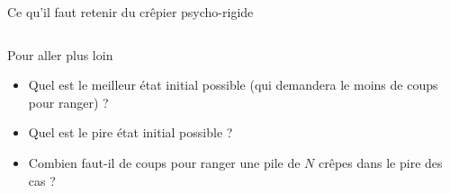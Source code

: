 \begin{frame}{Ce qu'il faut retenir du  crêpier psycho-rigide}
\begin{columns}
\begin{column}{.3\linewidth}
\begin{block}{Pour aller plus loin}
        \begin{itemize}
          \item Quel est le meilleur état initial possible (qui demandera le moins de coups pour ranger) ?
          \item Quel est le pire état initial possible ?
          \item Combien faut-il de coups pour ranger une pile de $N$ crêpes dans le pire des cas ?
        \end{itemize}
      \end{block}
    \end{column}
  \end{columns}
      
\end{frame}
